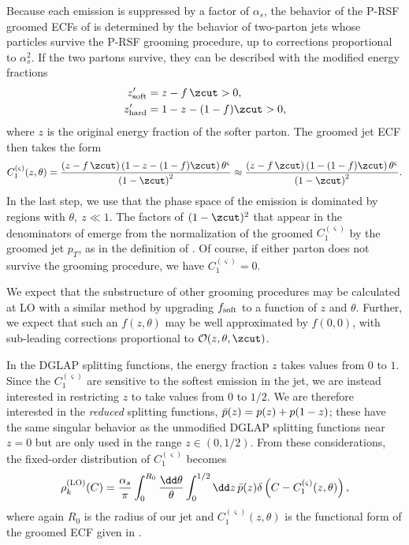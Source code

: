 Because each emission is suppressed by a factor of \(\alpha_s\), the behavior of the P-RSF groomed ECFs of  is determined by the behavior of two-parton jets whose particles survive the P-RSF grooming procedure, up to corrections proportional to \(\alpha_s^2\).
%
If the two partons survive, they can be described with the modified energy fractions
\begin{align}
    z_{\rm soft}' &= z - f\,\zcut > 0,
    \\
    z_{\rm hard}' &= 1 - z - (1-f)\zcut > 0,
\end{align}
where \(z\) is the original energy fraction of the softer parton.
%
The groomed jet ECF then takes the form
\begin{equation}
    C_1^{(\varsigma)}(z,\theta)
    =
    \frac{\left(z - f\,\zcut\right)\left(1 - z - (1-f)\zcut\right)\theta^\varsigma}{\left(1 - \zcut\right)^2}
    \approx
    \frac{\left(z - f\,\zcut\right)\left(1 - (1-f)\zcut\right)\theta^\varsigma}{\left(1 - \zcut\right)^2}
    \label{eqn:oneEm_groomedECFdefn}
    .
\end{equation}
In the last step, we use that the phase space of the emission is dominated by regions with \(\theta,~z \ll 1\).
%
The factors of \((1-\zcut)^2\) that appear in the denominators of  emerge from the normalization of the groomed \(C_1^{(\varsigma)}\) by the groomed jet \(p_T\), as in the definition of .
%
Of course, if either parton does not survive the grooming procedure, we have \(C_1^{(\varsigma)} = 0\).

We expect that the substructure of other \PIRANHA{} grooming procedures may be calculated at LO with a similar method by upgrading \(f_{\rm soft}\) to a function of \(z\) and \(\theta\).
%
Further, we expect that such an \(f(z, \theta)\) may be well approximated by \(f(0,0)\), with sub-leading corrections proportional to \(\mathcal{O}(z, \theta, \zcut)\).

In the DGLAP splitting functions, the energy fraction \(z\) takes values from \(0\) to \(1\).
%
Since the \(C_1^{(\varsigma)}\) are sensitive to the softest emission in the jet, we are instead interested in restricting \(z\) to take values from \(0\) to \(1/2\).
%
We are therefore interested in the \textit{reduced} splitting functions, \(\Bar{p}(z) = p(z) + p(1-z)\);
%
these have the same singular behavior as the unmodified DGLAP splitting functions near \(z = 0\) but are only used in the range \(z\in(0, 1/2)\).
%
From these considerations, the fixed-order distribution of \(C_1^{(\varsigma)}\) becomes
%
\begin{align}
    \rho^{\rm(LO)}_{k}(C)
    =
    \frac{\alpha_s}{\pi}\int_0^{R_0}\frac{\dd\theta}{\theta}
    \int_0^{1/2} \dd z\, \Bar{p}(z)
    \delta\left(C - C_1^{(\varsigma)}(z,\theta)\right),
    \label{eqn:LO_dist_setup}
\end{align}
%
where again \(R_0\) is the radius of our jet and \(C_1^{(\varsigma)}(z,\theta)\) is the functional form of the groomed ECF given in .

